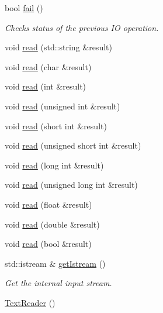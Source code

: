 \begin{DoxyCompactItemize}
bool \mbox{\hyperlink{classENSEM_1_1TextReader_ae21c25d2a62a1b242b09d745a314af69}{fail}} ()
\begin{DoxyCompactList}\small\item\em Checks status of the previous IO operation. \end{DoxyCompactList}\item 
void \mbox{\hyperlink{classENSEM_1_1TextReader_acbeb934e3316e4cf0c74d23dbe473d19}{read}} (std\+::string \&result)
\item 
void \mbox{\hyperlink{classENSEM_1_1TextReader_acfa438667353be1fd79c0170344eefe8}{read}} (char \&result)
\item 
void \mbox{\hyperlink{classENSEM_1_1TextReader_a674bcd7e14e71926e02d70939876ef56}{read}} (int \&result)
\item 
void \mbox{\hyperlink{classENSEM_1_1TextReader_aa35f21aaaa60529fe88ca35b13727d68}{read}} (unsigned int \&result)
\item 
void \mbox{\hyperlink{classENSEM_1_1TextReader_a74b47b82fb54027158d1623307f6e8c1}{read}} (short int \&result)
\item 
void \mbox{\hyperlink{classENSEM_1_1TextReader_a94c542aaec54ff618064c61e8602eefa}{read}} (unsigned short int \&result)
\item 
void \mbox{\hyperlink{classENSEM_1_1TextReader_a6175ad804f9b13604f1cc7466a95725a}{read}} (long int \&result)
\item 
void \mbox{\hyperlink{classENSEM_1_1TextReader_a88188c5da2fe2882d38e7f8fa70b6e29}{read}} (unsigned long int \&result)
\item 
void \mbox{\hyperlink{classENSEM_1_1TextReader_a67d7171b0abb40a3c33c7cc92452d78f}{read}} (float \&result)
\item 
void \mbox{\hyperlink{classENSEM_1_1TextReader_ac12d688ee2475e365919e16183b0c816}{read}} (double \&result)
\item 
void \mbox{\hyperlink{classENSEM_1_1TextReader_a0aa4b524a014a6c53980d4717b48b733}{read}} (bool \&result)
\item 
std\+::istream \& \mbox{\hyperlink{classENSEM_1_1TextReader_a855b7272df1bd50c18f730f3ac882428}{get\+Istream}} ()
\begin{DoxyCompactList}\small\item\em Get the internal input stream. \end{DoxyCompactList}\item 
\mbox{\hyperlink{classENSEM_1_1TextReader_a139e8717032f310089148dd58b30d1d2}{Text\+Reader}} ()
\item 

\end{DoxyCompactItemize}
